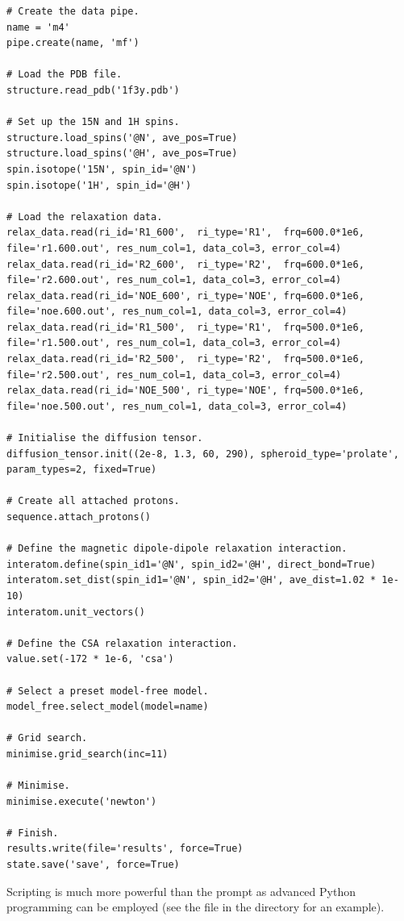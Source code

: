 \begin{lstlisting}
# Create the data pipe.
name = 'm4'
pipe.create(name, 'mf')

# Load the PDB file.
structure.read_pdb('1f3y.pdb')

# Set up the 15N and 1H spins.
structure.load_spins('@N', ave_pos=True)
structure.load_spins('@H', ave_pos=True)
spin.isotope('15N', spin_id='@N')
spin.isotope('1H', spin_id='@H')

# Load the relaxation data.
relax_data.read(ri_id='R1_600',  ri_type='R1',  frq=600.0*1e6, file='r1.600.out', res_num_col=1, data_col=3, error_col=4)
relax_data.read(ri_id='R2_600',  ri_type='R2',  frq=600.0*1e6, file='r2.600.out', res_num_col=1, data_col=3, error_col=4)
relax_data.read(ri_id='NOE_600', ri_type='NOE', frq=600.0*1e6, file='noe.600.out', res_num_col=1, data_col=3, error_col=4)
relax_data.read(ri_id='R1_500',  ri_type='R1',  frq=500.0*1e6, file='r1.500.out', res_num_col=1, data_col=3, error_col=4)
relax_data.read(ri_id='R2_500',  ri_type='R2',  frq=500.0*1e6, file='r2.500.out', res_num_col=1, data_col=3, error_col=4)
relax_data.read(ri_id='NOE_500', ri_type='NOE', frq=500.0*1e6, file='noe.500.out', res_num_col=1, data_col=3, error_col=4)

# Initialise the diffusion tensor.
diffusion_tensor.init((2e-8, 1.3, 60, 290), spheroid_type='prolate', param_types=2, fixed=True)

# Create all attached protons.
sequence.attach_protons()

# Define the magnetic dipole-dipole relaxation interaction.
interatom.define(spin_id1='@N', spin_id2='@H', direct_bond=True)
interatom.set_dist(spin_id1='@N', spin_id2='@H', ave_dist=1.02 * 1e-10)
interatom.unit_vectors()

# Define the CSA relaxation interaction.
value.set(-172 * 1e-6, 'csa')

# Select a preset model-free model.
model_free.select_model(model=name)

# Grid search.
minimise.grid_search(inc=11)

# Minimise.
minimise.execute('newton')

# Finish.
results.write(file='results', force=True)
state.save('save', force=True)
\end{lstlisting}

Scripting is much more powerful than the prompt as advanced Python programming can be employed (see the file  in the  directory for an example).




